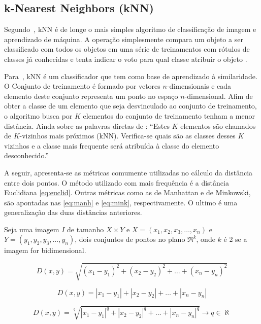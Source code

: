 \subsection{\textbf{k-Nearest Neighbors (kNN)}}

Segundo~, kNN é de longe o mais simples algoritmo de classificação de imagem e aprendizado de máquina. A operação simplesmente compara um objeto a ser classificado com todos os objetos em uma série de treinamentos com rótulos de classes já conhecidas e tenta indicar o voto para qual classe atribuir o objeto \cite{solem2012}.

Para~, kNN é um classificador que tem como base de aprendizado à similaridade. O Conjunto de treinamento é formado por vetores $n$-dimensionais e cada elemento deste conjunto representa um ponto no espaço $n$-dimensional. Afim de obter a classe de um elemento que seja desvinculado ao conjunto de treinamento, o algoritmo busca por $K$ elementos do conjunto de treinamento tenham a menor distância. Ainda sobre as palavras diretas de \cite{luiza2005}: ``Estes $K$ elementos são chamados de $K$-vizinhos mais próximos (kNN). Verifica-se quais são as classes desses $K$ vizinhos e a classe mais frequente será atribuída à classe do elemento desconhecido.''

A seguir, apresenta-se as métricas comumente utilizadas no cálculo da distância entre dois pontos. O método utilizado com mais frequência é a distância Euclidiana \autoref{eq:euclid}. Outras métricas como as de Manhattan e de Minkowski, são apontadas nas \autoref{eq:manh} e \autoref{eq:mink}, respectivamente. O ultimo é uma generalização das duas distâncias anteriores.

Seja uma imagem $I$ de tamanho $X \times Y$ e $X=(x_1,x_2,x_3,\ldots,x_n)$ e $Y=(y_1,y_2,y_3,\ldots,y_n)$, dois conjuntos de pontos no plano $\Re^k$, onde $k$ é 2 se a imagem for bidimensional.

\begin{equation} \label{eq:euclid}
D(x,y) = \sqrt{(x_1-y_1)^2 + (x_2-y_2)^2 + \ldots + (x_n - y_n)^2}
\end{equation}

\begin{equation} \label{eq:manh}
D(x,y) = |x_1-y_1|+|x_2-y_2|+\ldots+|x_n-y_n|
\end{equation}

\begin{equation} \label{eq:mink}
D(x,y) = \sqrt[q]{|x_1-y_1|^q + |x_2-y_2|^q + \ldots + |x_n-y_n|^q} \rightarrow q \in \aleph
\end{equation}

